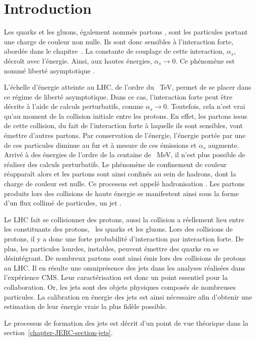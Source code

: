 \section{Introduction}\label{chapter-JERC-section-introduction}
Les quarks et les gluons, également nommés \og partons \fg, sont les particules portant une charge de couleur non nulle.
Ils sont donc sensibles à l'interaction forte, abordée dans le chapitre~.
La constante de couplage de cette interaction, $\alpha_s$, décroît avec l'énergie.
Ainsi, aux hautes énergies, $\alpha_s \to 0$.
Ce phénomène est nommé \og liberté asymptotique \fg.
\par
L'échelle d'énergie atteinte au LHC, de l'ordre du \SI{}{\TeV}, permet de se placer dans ce régime de liberté asymptotique.
Dans ce cas, l'interaction forte peut être décrite à l'aide de calculs perturbatifs, comme $\alpha_s \to 0$.
Toutefois, cela n'est vrai qu'au moment de la collision initiale entre les protons.
En effet, les partons issus de cette collision, du fait de l'interaction forte à laquelle ils sont sensibles, vont émettre d'autres partons.
Par conservation de l'énergie, l'énergie portée par une de ces particules diminue au fur et à mesure de ces émissions et $\alpha_s$ augmente.
Arrivé à des énergies de l'ordre de la centaine de \SI{}{\MeV}, il n'est plus possible de réaliser des calculs perturbatifs.
Le phénomène de confinement de couleur réapparaît alors et les partons sont ainsi confinés au sein de hadrons, dont la charge de couleur est nulle.
Ce processus est appelé \og hadronisation \fg.
Les partons produits lors des collisions de haute énergie se manifestent ainsi sous la forme d'un flux collimé de particules, un \og jet \fg.
\par Le LHC fait se collisionner des protons, aussi la collision a réellement lieu entre les constituants des protons, \ie\ les quarks et les gluons.
Lors des collisions de protons, il y a donc une forte probabilité d'interaction par interaction forte.
De plus, les particules lourdes, instables, peuvent émettre des quarks en se désintégrant.
De nombreux partons sont ainsi émis lors des collisions de protons au LHC.
Il en résulte une omniprésence des jets dans les analyses réalisées dans l'expérience CMS.
Leur caractérisation est donc un point essentiel pour la collaboration.
Or, les jets sont des objets physiques composés de nombreuses particules.
La calibration en énergie des jets est ainsi nécessaire afin d'obtenir une estimation de leur énergie \og vraie \fg{} la plus fidèle possible.
\par Le processus de formation des jets est décrit d'un point de vue théorique dans la section~\ref{chapter-JERC-section-jets}.
